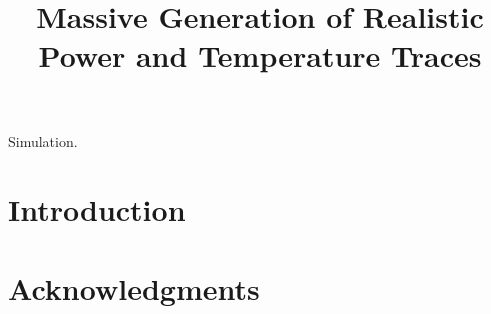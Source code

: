 \documentclass[conference]{IEEEtran}
\title{
  Massive Generation of Realistic\\
  Power and Temperature Traces
}
\author{}
\begin{document}
  \maketitle

  \begin{abstract}
    
  \end{abstract}

  \begin{IEEEkeywords}
    Simulation.
  \end{IEEEkeywords}


  \section{Introduction} 
  

  \section*{Acknowledgments}
  

  \begingroup
    
    
  \endgroup
\end{document}
